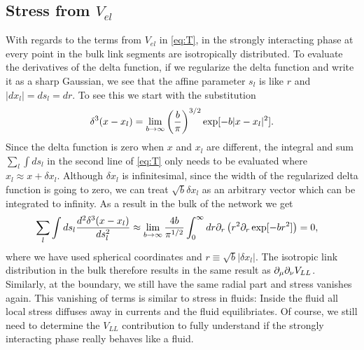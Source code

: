 \documentclass[linenumbers,endfloats,nofootinbib,preprint,floatfix,titlepage,superscriptaddress]{revtex4-1} %
\begin{document}
\subsection{Stress from $V_{el}$}
With regards to the terms from $V_{el}$ in \eqref{eq:T}, in the strongly interacting phase at every point in the bulk link segments are isotropically distributed. 
To evaluate the derivatives of the delta function, if we regularize the delta function and write it as a sharp Gaussian, we see that the affine parameter $s_l$ is like $r$ and $|dx_l|= ds_l = dr$. 
To see this we start with the substitution
\[\delta^3(x-x_l) = \lim_{b\to \infty } \left({b \over\pi}\right)^{3/2} \exp[-b|x-x_l|^2].\]
Since the delta function is zero when $x$ and $x_l$ are different, the integral and sum $\sum_l\int ds_l$ in the second line of \eqref{eq:T} only needs to be evaluated where $x_l \approx x+\delta x_l $. 
Although $\delta x_l$ is infinitesimal, since the width of the regularized delta function is going to zero, we can treat $\sqrt{b}\delta x_l$ as an arbitrary vector which can be integrated to infinity. 
As a result in the bulk of the network we get 
\begin{align}\sum_l\int ds_l {d^2 \delta^3(x-x_l)\over ds_l^2} & \approx 
    \lim_{b\to \infty } {4b \over \pi^{1/2}} \int_0^\infty d r {\partial_r} \left(r^2 \partial_r \exp[-br^2]\right) = 0, 
\end{align}
where we have used spherical coordinates and $r \equiv \sqrt{b} | \delta x_l| $.
The isotropic link distribution in the bulk therefore results in the same result as $  \partial_\mu \partial_\nu V_{LL}$.
Similarly, at the boundary, we still have the same radial part and stress vanishes again. 
This vanishing of terms is similar to stress in fluids: Inside the fluid all local stress diffuses away in currents and the fluid equilibriates. 
Of course, we still need to determine the $V_{LL}$ contribution to fully understand if the strongly interacting phase really behaves like a fluid. 
\end{document}
